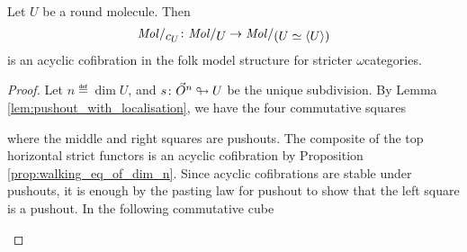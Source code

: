 \begin{prop} \label{prop:molecin_send_Jcomp_to_acof}
    Let \( U \) be a round molecule.
    Then
    \begin{equation*}
        \molecin{c_U} \colon \molecin{U} \to \molecin{(U \simeq \compos{U})}
    \end{equation*}
    is an acyclic cofibration in the folk model structure for stricter \( \omega \)\nbd categories.
\end{prop}
\begin{proof}
    Let \( n \eqdef \dim U \), and \( s \colon \vec{O}^{n} \looparrowright U \) be the unique subdivision.
    By Lemma \ref{lem:pushout_with_localisation}, we have the four commutative squares
    \begin{center}
    \end{center}
    where the middle and right squares are pushouts.
    The composite of the top horizontal strict functors is an acyclic cofibration by Proposition \ref{prop:walking_eq_of_dim_n}.
    Since acyclic cofibrations are stable under pushouts, it is enough by the pasting law for pushout to show that the left square is a pushout.
    In the following commutative cube
    \begin{center}
\end{center}
\end{proof}
